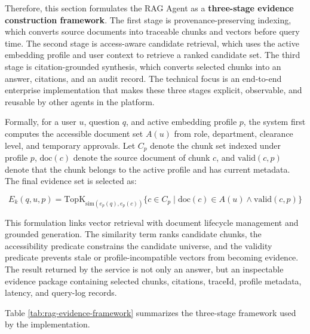 Therefore, this section formulates the RAG Agent as a \textbf{three-stage evidence construction framework}. The first stage is provenance-preserving indexing, which converts source documents into traceable chunks and vectors before query time. The second stage is access-aware candidate retrieval, which uses the active embedding profile and user context to retrieve a ranked candidate set. The third stage is citation-grounded synthesis, which converts selected chunks into an answer, citations, and an audit record. The technical focus is an end-to-end enterprise implementation that makes these three stages explicit, observable, and reusable by other agents in the platform.

Formally, for a user $u$, question $q$, and active embedding profile $p$, the system first computes the accessible document set $A(u)$ from role, department, clearance level, and temporary approvals. Let $C_p$ denote the chunk set indexed under profile $p$, $\mathrm{doc}(c)$ denote the source document of chunk $c$, and $\mathrm{valid}(c,p)$ denote that the chunk belongs to the active profile and has current metadata. The final evidence set is selected as:

\[
E_k(q,u,p)=\mathrm{TopK}_{\mathrm{sim}(e_p(q),e_p(c))}
\{c \in C_p \mid \mathrm{doc}(c)\in A(u) \land \mathrm{valid}(c,p)\}
\]

This formulation links vector retrieval with document lifecycle management and grounded generation. The similarity term ranks candidate chunks, the accessibility predicate constrains the candidate universe, and the validity predicate prevents stale or profile-incompatible vectors from becoming evidence. The result returned by the service is not only an answer, but an inspectable evidence package containing selected chunks, citations, traceId, profile metadata, latency, and query-log records.

Table \ref{tab:rag-evidence-framework} summarizes the three-stage framework used by the implementation.

\vspace{3mm}

